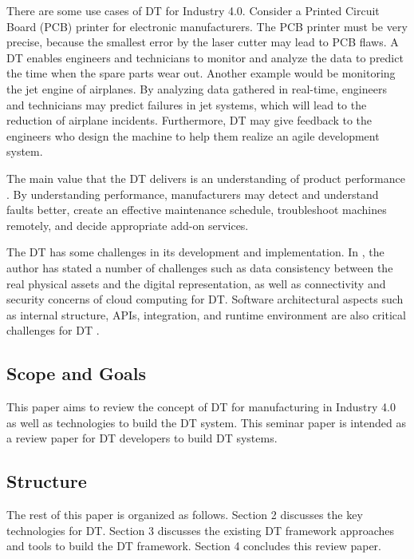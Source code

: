 \documentclass[article,table]{aaltoseries}
\begin{document}
There are some use cases of DT for Industry 4.0. Consider a Printed Circuit Board (PCB) printer for electronic manufacturers. The PCB printer must be very precise, because the smallest error by the laser cutter may lead to PCB flaws. A DT enables engineers and technicians to monitor and analyze the data to predict the time when the spare parts wear out. Another example would be monitoring the jet engine of airplanes. By analyzing data gathered in real-time, engineers and technicians may predict failures in jet systems, which will lead to the reduction of airplane incidents. Furthermore, DT may give feedback to the engineers who design the machine to help them realize an agile development system.

The main value that the DT delivers is an understanding of product performance \cite{Cheatshe3:online}. By understanding performance, manufacturers may detect and understand faults better, create an effective maintenance schedule, troubleshoot machines remotely, and decide appropriate add-on services.

The DT has some challenges in its development and implementation. In \cite{bienhaus2017patterns}, the author has stated a number of challenges such as data consistency between the real physical assets and the digital representation, as well as connectivity and security concerns of cloud computing for DT. Software architectural aspects such as internal structure, APIs, integration, and runtime environment are also critical challenges for DT \cite{malakuti2018architectural}.

\subsection{Scope and Goals}
\label{sec:emphasis}
This paper aims to review the concept of DT for manufacturing in Industry 4.0 as well as technologies to build the DT system. This seminar paper is intended as a review paper for DT developers to build DT systems.

\subsection{Structure}
\label{sec:em}
The rest of this paper is organized as follows. Section 2 discusses the key technologies for DT. Section 3 discusses the existing DT framework approaches and tools to build the DT framework. Section 4 concludes this review paper.
 

\end{document}
